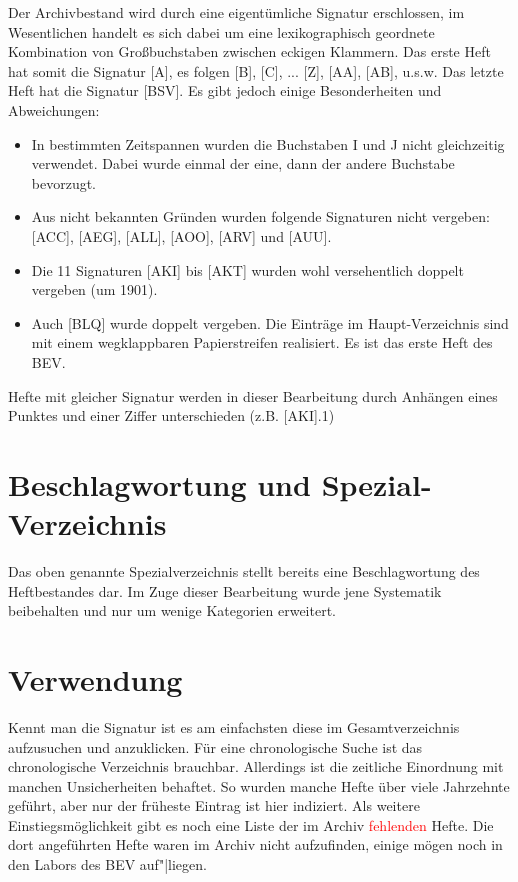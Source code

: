 \documentclass[a4paper]{scrbook}
\begin{document}
Der Archivbestand wird durch eine eigentümliche Signatur erschlossen, im Wesentlichen handelt es sich dabei um eine lexikographisch geordnete Kombination von Großbuchstaben zwischen eckigen Klammern. Das erste Heft hat somit die Signatur [A], es folgen [B], [C], ... [Z], [AA], [AB], u.s.w. Das letzte Heft hat die Signatur [BSV]. Es gibt jedoch einige Besonderheiten und Abweichungen:

\begin{itemize}
\item In bestimmten Zeitspannen wurden die Buchstaben I und J nicht gleichzeitig verwendet. Dabei wurde einmal der eine, dann der andere Buchstabe bevorzugt.
\item Aus nicht bekannten Gründen wurden folgende Signaturen nicht vergeben: [ACC], [AEG], [ALL], [AOO], [ARV] und [AUU].
\item Die 11 Signaturen [AKI] bis [AKT] wurden wohl versehentlich doppelt vergeben (um 1901).
\item Auch [BLQ] wurde doppelt vergeben. Die Einträge im Haupt-Verzeichnis sind mit einem wegklappbaren Papierstreifen realisiert. Es ist das erste Heft des BEV.
\end{itemize}
Hefte mit gleicher Signatur werden in dieser Bearbeitung durch Anhängen eines Punktes und einer Ziffer unterschieden (z.B. [AKI].1)

\section{Beschlagwortung und Spezial-Verzeichnis}

Das oben genannte \glqq{}Spezialverzeichnis\grqq{} stellt bereits eine Beschlagwortung des Heftbestandes dar. Im Zuge dieser Bearbeitung wurde jene Systematik beibehalten und nur um wenige Kategorien erweitert.

\section{Verwendung}

Kennt man die Signatur ist es am einfachsten diese im Gesamtverzeichnis aufzusuchen und anzuklicken. Für eine chronologische Suche ist das chronologische Verzeichnis brauchbar. Allerdings ist die zeitliche Einordnung mit manchen Unsicherheiten behaftet. So wurden manche Hefte über viele Jahrzehnte geführt, aber nur der früheste Eintrag ist hier indiziert. Als weitere Einstiegsmöglichkeit gibt es noch eine Liste der im Archiv \textcolor{red}{fehlenden} Hefte. Die dort angeführten Hefte waren im Archiv nicht aufzufinden, einige mögen noch in den Labors des BEV auf"|liegen.
  
\end{document}

